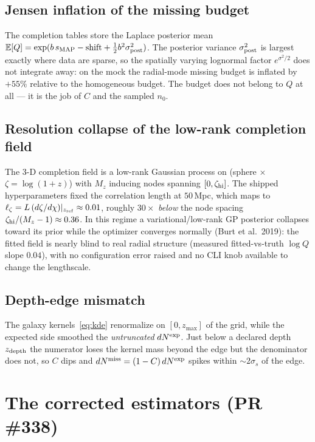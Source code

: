 \documentclass[11pt]{article}
\newcommand{\dNexp}{dN^{\rm exp}}
\newcommand{\dNmiss}{dN^{\rm miss}}
\begin{document}
\subsection{Jensen inflation of the missing budget}

The completion tables store the Laplace posterior mean
$\mathbb{E}[Q] = \exp( b\,s_{\rm MAP} - \text{shift} + \tfrac12 b^2 \sigma^2_{\rm post})$.
The posterior variance $\sigma^2_{\rm post}$ is largest exactly where data are sparse,
so the spatially varying lognormal factor $e^{\sigma^2/2}$ does not integrate away:
on the mock the radial-mode missing budget is inflated by $+55\%$ relative to the
homogeneous budget. The budget does not belong to $Q$ at all --- it is the job of
$C$ and the sampled $n_0$.

\subsection{Resolution collapse of the low-rank completion field}

The 3-D completion field is a low-rank Gaussian process on (sphere $\times$
$\zeta = \log(1+z)$) with $M_z$ inducing nodes spanning $[0, \zeta_{\rm hi}]$. The
shipped hyperparameters fixed the correlation length at $50\,$Mpc, which maps to
$\ell_\zeta = L\,({d\zeta}/{d\chi})|_{z_{\rm ref}} \approx 0.01$, roughly $30\times$
\emph{below} the node spacing $\zeta_{\rm hi}/(M_z - 1) \approx 0.36$. In this regime
a variational/low-rank GP posterior collapses toward its prior while the optimizer
converges normally (Burt et al.\ 2019): the fitted field is nearly blind to real
radial structure (measured fitted-vs-truth $\log Q$ slope $0.04$), with no
configuration error raised and no CLI knob available to change the lengthscale.

\subsection{Depth-edge mismatch}

The galaxy kernels~\eqref{eq:kde} renormalize on $[0, z_{\max}]$ of the grid, while
the expected side smoothed the \emph{untruncated} $\dNexp$. Just below a declared
depth $z_{\rm depth}$ the numerator loses the kernel mass beyond the edge but the
denominator does not, so $C$ dips and
$\dNmiss = (1-C)\,\dNexp$ spikes within $\sim 2\sigma_s$ of the edge.

\section{The corrected estimators (PR \#338)}
\label{sec:new}
\end{document}
